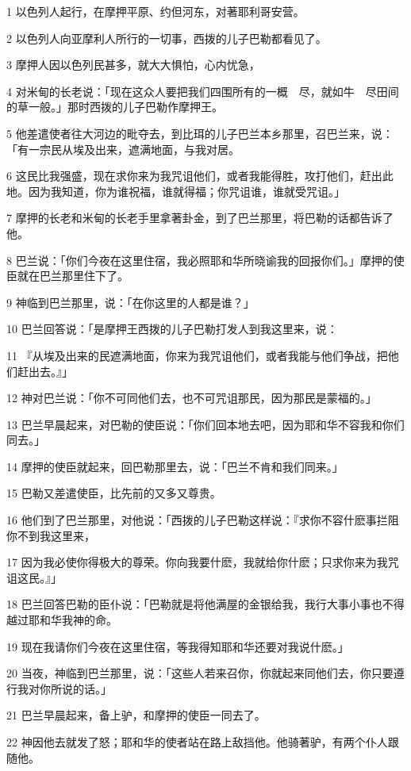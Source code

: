 \par 1 以色列人起行，在摩押平原、约但河东，对著耶利哥安营。
\par 2 以色列人向亚摩利人所行的一切事，西拨的儿子巴勒都看见了。
\par 3 摩押人因以色列民甚多，就大大惧怕，心内忧急，
\par 4 对米甸的长老说：「现在这众人要把我们四围所有的一概　尽，就如牛　尽田间的草一般。」那时西拨的儿子巴勒作摩押王。
\par 5 他差遣使者往大河边的毗夺去，到比珥的儿子巴兰本乡那里，召巴兰来，说：「有一宗民从埃及出来，遮满地面，与我对居。
\par 6 这民比我强盛，现在求你来为我咒诅他们，或者我能得胜，攻打他们，赶出此地。因为我知道，你为谁祝福，谁就得福；你咒诅谁，谁就受咒诅。」
\par 7 摩押的长老和米甸的长老手里拿著卦金，到了巴兰那里，将巴勒的话都告诉了他。
\par 8 巴兰说：「你们今夜在这里住宿，我必照耶和华所晓谕我的回报你们。」摩押的使臣就在巴兰那里住下了。
\par 9 神临到巴兰那里，说：「在你这里的人都是谁？」
\par 10 巴兰回答说：「是摩押王西拨的儿子巴勒打发人到我这里来，说：
\par 11 『从埃及出来的民遮满地面，你来为我咒诅他们，或者我能与他们争战，把他们赶出去。』」
\par 12 神对巴兰说：「你不可同他们去，也不可咒诅那民，因为那民是蒙福的。」
\par 13 巴兰早晨起来，对巴勒的使臣说：「你们回本地去吧，因为耶和华不容我和你们同去。」
\par 14 摩押的使臣就起来，回巴勒那里去，说：「巴兰不肯和我们同来。」
\par 15 巴勒又差遣使臣，比先前的又多又尊贵。
\par 16 他们到了巴兰那里，对他说：「西拨的儿子巴勒这样说：『求你不容什麽事拦阻你不到我这里来，
\par 17 因为我必使你得极大的尊荣。你向我要什麽，我就给你什麽；只求你来为我咒诅这民。』」
\par 18 巴兰回答巴勒的臣仆说：「巴勒就是将他满屋的金银给我，我行大事小事也不得越过耶和华我神的命。
\par 19 现在我请你们今夜在这里住宿，等我得知耶和华还要对我说什麽。」
\par 20 当夜，神临到巴兰那里，说：「这些人若来召你，你就起来同他们去，你只要遵行我对你所说的话。」
\par 21 巴兰早晨起来，备上驴，和摩押的使臣一同去了。
\par 22 神因他去就发了怒；耶和华的使者站在路上敌挡他。他骑著驴，有两个仆人跟随他。
